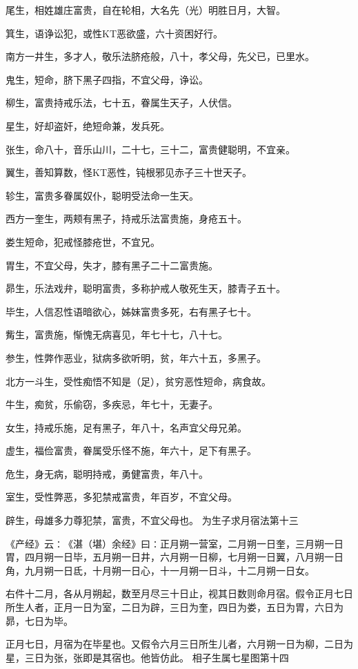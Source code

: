 \documentclass[a4paper,12pt,UTF8,twoside]{ctexbook}
\begin{document}
尾生，相姓雄庄富贵，自在轮相，大名先（光）明胜日月，大智。

箕生，语诤讼犯，或性KT恶欲盛，六十资困好行。

南方一井生，多才人，敬乐法脐疮般，八十，孝父母，先父已，已里水。

鬼生，短命，脐下黑子四指，不宜父母，诤讼。

柳生，富贵持戒乐法，七十五，眷属生天子，人伏信。

星生，好却盗奸，绝短命兼，发兵死。

张生，命八十，音乐山川，二十七，三十二，富贵健聪明，不宜亲。

翼生，善知算数，怪KT恶性，钝根邪见赤子三十世天子。

轸生，富贵多眷属奴仆，聪明受法命一生天。

西方一奎生，两颊有黑子，持戒乐法富贵施，身疮五十。

娄生短命，犯戒怪膝疮世，不宜兄。

胃生，不宜父母，失才，膝有黑子二十二富贵施。

昴生，乐法戏弁，聪明富贵，多称护戒人敬死生天，膝青子五十。

毕生，人信忍性语暗欲心，姊妹富贵多死，右有黑子七十。

觜生，富贵施，惭愧无病喜见，年七十七，八十七。

参生，性弊作恶业，狱病多欲听明，贫，年六十五，多黑子。

北方一斗生，受性痴悟不知是（足），贫穷恶性短命，病食故。

牛生，痴贫，乐偷窃，多疾忌，年七十，无妻子。

女生，持戒乐施，足有黑子，年八十，名声宜父母兄弟。

虚生，福俭富贵，眷属受乐怪不施，年六十，足下有黑子。

危生，身无病，聪明持戒，勇健富贵，年八十。

室生，受性弊恶，多犯禁戒富贵，年百岁，不宜父母。

辟生，母雄多力尊犯禁，富贵，不宜父母也。
为生子求月宿法第十三

《产经》云∶《湛（堪）余经》曰∶正月朔一营室，二月朔一日奎，三月朔一日胃，四月朔一日毕，五月朔一日井，六月朔一日柳，七月朔一日翼，八月朔一日角，九月朔一日氐，十月朔一日心，十一月朔一日斗，十二月朔一日女。

右件十二月，各从月朔起，数至月尽三十日止，视其日数则命月宿。假令正月七日所生人者，正月一日为室，二日为辟，三日为奎，四日为娄，五日为胃，六日为昴，七日为毕。

正月七日，月宿为在毕星也。又假令六月三日所生儿者，六月朔一日为柳，二日为星，三日为张，张即是其宿也。他皆仿此。
相子生属七星图第十四
\end{document}
